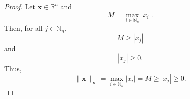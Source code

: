 \documentclass{article}
\theoremstyle{plain}
\begin{document}
\begin{proof}
  Let
  \begin{math}
    \bm{x} \in \mathbb{R}^n
  \end{math}
  and
  \begin{equation*}
    M = \max_{i \in \mathbb{N}_n} |x_i|.
  \end{equation*}
  Then, for all
  \begin{math}
    j \in \mathbb{N}_n ,
  \end{math}
  \begin{equation*}
    M \geq |x_j|
  \end{equation*}
  and
  \begin{equation*}
    |x_j| \geq 0 .
  \end{equation*}
  Thus,
  \begin{equation*}
    \lVert \bm{x} \rVert_\infty = \max_{i \in \mathbb{N}_n} |x_i| = M \geq |x_j| \geq 0 .
  \end{equation*}
\end{proof}
\end{document}
